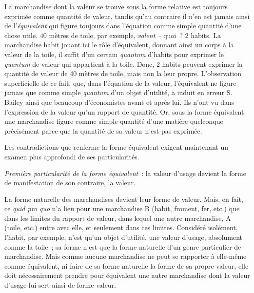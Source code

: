 \documentclass[french,twoside]{book} %
\begin{document}
La marchandise dont la valeur se trouve sous la forme relative est toujours exprimée comme quantité de valeur, tandis qu’au contraire il n’en est jamais ainsi de l’\emph{équivalent} qui figure toujours dans l’équation comme simple quantité d’une chose utile. 40 mètres de toile, par exemple, \emph{valent –} quoi ? 2 habits. La marchandise habit jouant ici le rôle d’équivalent, donnant ainsi un corps à la valeur de la toile, il suffit d’un certain \emph{quantum} d’habits pour exprimer le \emph{quantum} de valeur qui appartient à la toile. Donc, 2 habits peuvent exprimer la quantité de valeur de 40 mètres de toile, mais non la leur propre. L’observation superficielle de ce fait, que, dans l’équation de la valeur, l’équivalent ne figure jamais que comme simple \emph{quantum} d’un objet d’utilité, a induit en erreur S. Bailey ainsi que beaucoup d’économistes avant et après lui. Ils n’ont vu dans l’expression de la valeur qu’un rapport de quantité. Or, sous la forme équivalent une marchandise figure comme simple quantité d’une matière quelconque précisément parce que la quantité de sa valeur n’est pas exprimée.\par
Les contradictions que renferme la forme équivalent exigent maintenant un examen plus approfondi de ses particularités.\par
\emph{Première particularité de la forme équivalent} : la valeur d’usage devient la forme de manifestation de son contraire, la valeur.\par
La forme naturelle des marchandises devient leur forme de valeur. Mais, en fait, ce \emph{quid pro quo} n’a lieu pour une marchandise B (habit, froment, fer, etc.) que dans les limites du rapport de valeur, dans lequel une autre marchandise, A (toile, etc.) entre avec elle, et seulement dans ces limites. Considéré isolément, l’habit, par exemple, n’est qu’un objet d’utilité, une valeur d’usage, absolument comme la toile ; sa forme n’est que la forme naturelle d’un genre particulier de marchandise. Mais comme aucune marchandise ne peut se rapporter à elle-même comme équivalent, ni faire de sa forme naturelle la forme de sa propre valeur, elle doit nécessairement prendre pour équivalent une autre marchandise dont la valeur d’usage lui sert ainsi de forme valeur.\par
\end{document}
